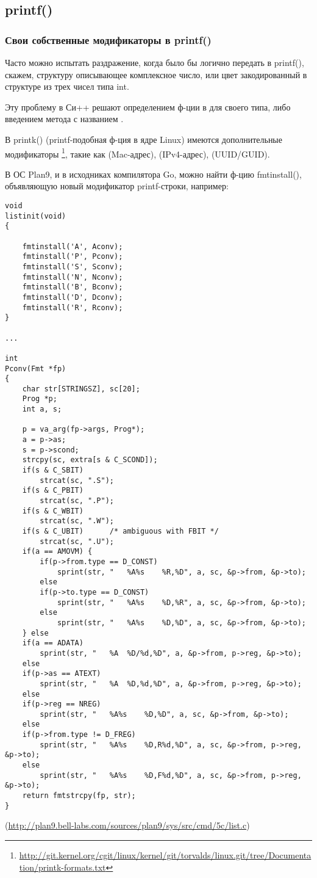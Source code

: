 ﻿\label{printf}
\subsection{printf()}

\subsubsection{Свои собственные модификаторы в printf()}

Часто можно испытать раздражение, когда было бы логично передать в printf(), скажем, структуру описывающее комплексное
число, или цвет закодированный в структуре из трех чисел типа int.

Эту проблему в Си++ решают определением ф-ции  в  для своего типа, либо введением
метода с названием .

В printk() (printf-подобная ф-ция в ядре Linux) имеются дополнительные модификаторы
\footnote{\url{http://git.kernel.org/cgit/linux/kernel/git/torvalds/linux.git/tree/Documentation/printk-formats.txt}}, 
такие как  (Mac-адрес),  (IPv4-адрес),  (UUID/GUID).

В ОС Plan9, и в исходниках компилятора Go, можно найти ф-цию fmtinstall(), объявляющую новый модификатор printf-строки,
например:

\begin{lstlisting}[caption=go\textbackslash{}src\textbackslash{}cmd\textbackslash{}5c\textbackslash{}list.c]
void
listinit(void)
{

	fmtinstall('A', Aconv);
	fmtinstall('P', Pconv);
	fmtinstall('S', Sconv);
	fmtinstall('N', Nconv);
	fmtinstall('B', Bconv);
	fmtinstall('D', Dconv);
	fmtinstall('R', Rconv);
}

...

int
Pconv(Fmt *fp)
{
	char str[STRINGSZ], sc[20];
	Prog *p;
	int a, s;

	p = va_arg(fp->args, Prog*);
	a = p->as;
	s = p->scond;
	strcpy(sc, extra[s & C_SCOND]);
	if(s & C_SBIT)
		strcat(sc, ".S");
	if(s & C_PBIT)
		strcat(sc, ".P");
	if(s & C_WBIT)
		strcat(sc, ".W");
	if(s & C_UBIT)		/* ambiguous with FBIT */
		strcat(sc, ".U");
	if(a == AMOVM) {
		if(p->from.type == D_CONST)
			sprint(str, "	%A%s	%R,%D", a, sc, &p->from, &p->to);
		else
		if(p->to.type == D_CONST)
			sprint(str, "	%A%s	%D,%R", a, sc, &p->from, &p->to);
		else
			sprint(str, "	%A%s	%D,%D", a, sc, &p->from, &p->to);
	} else
	if(a == ADATA)
		sprint(str, "	%A	%D/%d,%D", a, &p->from, p->reg, &p->to);
	else
	if(p->as == ATEXT)
		sprint(str, "	%A	%D,%d,%D", a, &p->from, p->reg, &p->to);
	else
	if(p->reg == NREG)
		sprint(str, "	%A%s	%D,%D", a, sc, &p->from, &p->to);
	else
	if(p->from.type != D_FREG)
		sprint(str, "	%A%s	%D,R%d,%D", a, sc, &p->from, p->reg, &p->to);
	else
		sprint(str, "	%A%s	%D,F%d,%D", a, sc, &p->from, p->reg, &p->to);
	return fmtstrcpy(fp, str);
}
\end{lstlisting}
(\url{http://plan9.bell-labs.com/sources/plan9/sys/src/cmd/5c/list.c})

